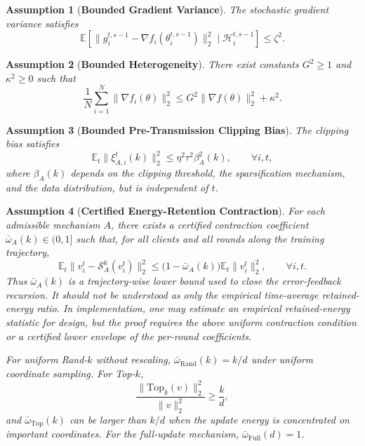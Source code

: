 \documentclass[conference]{IEEEtran}
\newtheorem{assumption}{Assumption}
\begin{document}
\begin{assumption}[\bf Bounded Gradient Variance]
    \label{assum:variance}
    The stochastic gradient variance satisfies
    \begin{equation}
        \mathbb{E}\left[
        \|g_i^{t,s-1}-\nabla f_i(\theta_i^{t,s-1})\|_2^2
        \mid\mathcal{H}_{i}^{t,s-1}
        \right]\le \zeta^2.
    \end{equation}
\end{assumption}

\begin{assumption}[\bf Bounded Heterogeneity]
    \label{assum:heterogeneity}
    There exist constants $G^2\ge 1$ and $\kappa^2\ge0$ such that
    \begin{equation}
        \frac1N\sum_{i=1}^{N}\|\nabla f_i(\theta)\|_2^2
        \le G^2\|\nabla f(\theta)\|_2^2+\kappa^2.
    \end{equation}
\end{assumption}

\begin{assumption}[\bf Bounded Pre-Transmission Clipping Bias]
    \label{assum:clipping}
    The clipping bias satisfies
    \begin{equation}
        \mathbb{E}_t\|\xi_{A,i}^t(k)\|_2^2
        \le \eta^2\tau^2\beta_A^2(k),
        \qquad \forall i,t,
    \end{equation}
    where $\beta_A(k)$ depends on the clipping threshold, the sparsification mechanism, and the data distribution, but is independent of $t$.
\end{assumption}

\begin{assumption}[\bf Certified Energy-Retention Contraction]
    \label{assum:contraction}
    For each admissible mechanism $A$, there exists a certified contraction coefficient $\bar{\omega}_A(k)\in(0,1]$ such that, for all clients and all rounds along the training trajectory,
    \begin{equation}
        \mathbb{E}_t\|v_i^t-\mathcal{S}_A^k(v_i^t)\|_2^2
        \le
        \big(1-\bar{\omega}_A(k)\big)\mathbb{E}_t\|v_i^t\|_2^2,
        \qquad \forall i,t.
    \end{equation}
    Thus $\bar{\omega}_A(k)$ is a trajectory-wise lower bound used to close the error-feedback recursion. It should not be understood as only the empirical time-average retained-energy ratio. In implementation, one may estimate an empirical retained-energy statistic for design, but the proof requires the above uniform contraction condition or a certified lower envelope of the per-round coefficients.

    For uniform Rand-$k$ without rescaling, $\bar{\omega}_{\mathrm{Rand}}(k)=k/d$ under uniform coordinate sampling. For Top-$k$,
    \begin{equation}
        \frac{\|\mathrm{Top}_k(v)\|_2^2}{\|v\|_2^2}\ge \frac{k}{d},
    \end{equation}
    and $\bar{\omega}_{\mathrm{Top}}(k)$ can be larger than $k/d$ when the update energy is concentrated on important coordinates. For the full-update mechanism, $\bar{\omega}_{\mathrm{Full}}(d)=1$.
\end{assumption}
\end{document}
